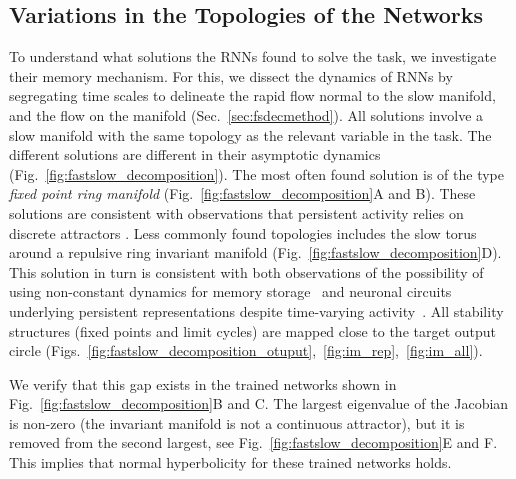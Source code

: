 \documentclass{article} %
\newcounter{ct}
\theoremstyle{definition}
\theoremstyle{remark}
\begin{document}
\subsection{Variations in the Topologies of the Networks}\label{sec:topologies}
To understand what solutions the RNNs found to solve the task, we investigate their memory mechanism.
For this, we dissect the dynamics of RNNs by segregating time scales to delineate the rapid flow normal to the slow manifold, and the flow on the manifold (Sec.~\ref{sec:fsdecmethod}).
All solutions involve a slow manifold with the same topology as the relevant variable in the task.
The different solutions are different in their asymptotic dynamics (Fig.~\ref{fig:fastslow_decomposition}).
The most often found solution is of the type \emph{fixed point ring manifold} (Fig.~\ref{fig:fastslow_decomposition}A and B).
These solutions are consistent with observations that persistent activity relies on discrete attractors \citep{brody2003, inagaki2019}.
Less commonly found topologies includes the slow torus around a repulsive ring invariant manifold (Fig.~\ref{fig:fastslow_decomposition}D).
This solution in turn is consistent with both observations of the possibility of using non-constant dynamics for memory storage~\citep{hirsch1995computing, Park2023a} and neuronal circuits underlying persistent representations despite time-varying activity~\citep{druckmann2012neuronal}.
All stability structures (fixed points and limit cycles) are mapped close to the target output circle (Figs.~\ref{fig:fastslow_decomposition_otuput},~\ref{fig:im_rep},~\ref{fig:im_all}).

We verify that this gap exists in the trained networks shown in Fig.~\ref{fig:fastslow_decomposition}B and C.
The largest  eigenvalue of the Jacobian is non-zero (the invariant manifold is not a continuous attractor), but it is removed from the second largest, see Fig.~\ref{fig:fastslow_decomposition}E and F.
This implies that normal hyperbolicity for these trained networks holds.
\end{document}
